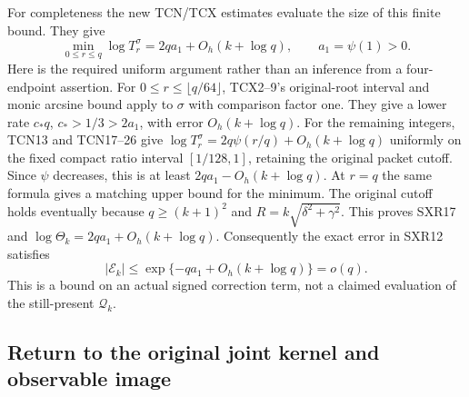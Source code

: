 For completeness the new TCN/TCX estimates evaluate the size of
this finite bound. They give
\begin{equation}\tag{SXR17}
 \min_{0\le r\le q}\log T_r^\sigma
        =2q a_1+O_h(k+\log q),\qquad a_1=\psi(1)>0.
\end{equation}
Here is the required uniform argument rather than an inference
from a four-endpoint assertion. For
$0\le r\le\lfloor q/64\rfloor$, TCX2--9's original-root interval
and monic arcsine bound apply to $\sigma$ with comparison factor
one. They give a lower rate $c_*q$, $c_*>1/3>2a_1$, with
error $O_h(k+\log q)$. For the remaining integers, TCN13 and
TCN17--26 give $\log T_r^\sigma=2q\psi(r/q)+O_h(k+\log q)$
uniformly on the fixed compact ratio interval $[1/128,1]$,
retaining the original packet cutoff. Since $\psi$ decreases,
this is at least $2qa_1-O_h(k+\log q)$. At $r=q$ the same formula
gives a matching upper bound for the minimum. The original cutoff
holds eventually because $q\ge(k+1)^2$ and
$R=k\sqrt{\delta^2+\gamma^2}$. This proves SXR17 and
$\log\Theta_k=2qa_1+O_h(k+\log q)$.
Consequently the exact error in SXR12 satisfies
\begin{equation}\tag{SXR18}
 \boxed{|\mathcal E_k|
       \le\exp\{-qa_1+O_h(k+\log q)\}=o(q).}
\end{equation}
This is a bound on an actual signed correction term, not a claimed
evaluation of the still-present $\mathcal Q_k$.

\subsection{Return to the original joint kernel and observable image}

